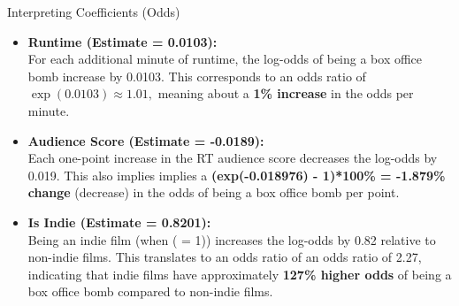 \documentclass[
  10pt,
  ignorenonframetext,
]{beamer}
\begin{document}
\begin{frame}{Interpreting Coefficients (Odds)}
\label{interpreting-coefficients-odds}
\scriptsize

\begin{itemize}
\item
  \textbf{Runtime (Estimate = 0.0103):}\\
  For each additional minute of runtime, the log-odds of being a box
  office bomb increase by 0.0103. This corresponds to an odds ratio of
  \(\exp(0.0103) \approx 1.01,\) meaning about a \textbf{1\% increase}
  in the odds per minute.
\item
  \textbf{Audience Score (Estimate = -0.0189):}\\
  Each one-point increase in the RT audience score decreases the
  log-odds by 0.019. This also implies implies a \textbf{(exp(-0.018976)
  - 1)*100\% = -1.879\% change} (decrease) in the odds of being a box
  office bomb per point.
\item
  \textbf{Is Indie (Estimate = 0.8201):}\\
  Being an indie film (when ( = 1)) increases the
  log-odds by 0.82 relative to non-indie films. This translates to an
  odds ratio of an odds ratio of 2.27, indicating that indie films have
  approximately \textbf{127\% higher odds} of being a box office bomb
  compared to non-indie films.
\end{itemize}
\end{frame}
\end{document}
